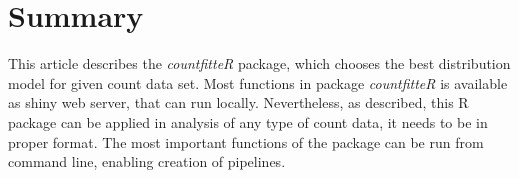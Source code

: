 


\section{Summary}

This article describes the \emph{countfitteR} package, which chooses the best distribution model for given count data set. Most functions in package \emph{countfitteR} is available as shiny web server, that can run locally. Nevertheless, as described, this R package can be applied in analysis of any type of count data, it needs to be in proper format. 
The most important functions of the package can be run from command line, enabling creation of pipelines.



\address{Jaros\l{}aw Chilmoniuk\\
  University of Wroc\l{}aw\\
  Pl. Uniwersytecki 1, Wroc\l{}aw\\
  Poland\\
  ORCiD: 0000-0001-5467-018X\\
  }

\address{Madeleine Ruhe\\
  Brandenburg University of Technology Cottbus - Senftenberg\\
  Universit\"atsplatz 1, Senftenberg\\
  Germany\\
  ORCiD if desired\\
  }

